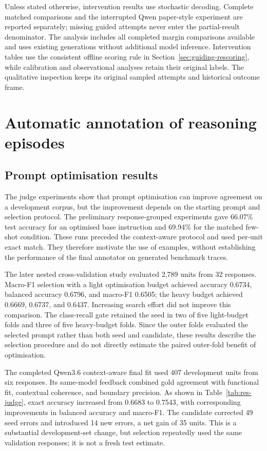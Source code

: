 \documentclass[12pt,a4paper,twoside,openright]{book}
\begin{document}
Unless stated otherwise, intervention results use
stochastic decoding. Complete matched comparisons and the interrupted
Qwen paper-style experiment are reported separately; missing guided
attempts never enter the partial-result denominator. The analysis includes
all completed margin comparisons available and uses existing
generations without additional model inference. Intervention tables use the consistent offline scoring rule in
Section~\ref{sec:guiding-rescoring}, while calibration and observational
analyses retain their original labels. The qualitative inspection keeps
its original sampled attempts and historical outcome frame.

\section{Automatic annotation of reasoning episodes}
\label{sec:results-annotation}

\subsection{Prompt optimisation results}

The judge experiments show that prompt optimisation can improve agreement
on a development corpus, but the improvement depends on the starting prompt
and selection protocol. The preliminary response-grouped experiments gave
66.07\% test accuracy for an optimised base instruction and 69.94\% for the
matched few-shot condition. These runs preceded the context-aware protocol
and used per-unit exact match. They therefore motivate the use of examples,
without establishing the performance of the final annotator on generated
benchmark traces.

The later nested cross-validation study evaluated 2,789 units from 32
responses. Macro-F1 selection with a light optimisation budget achieved
accuracy 0.6734, balanced accuracy 0.6796, and macro-F1 0.6505; the heavy
budget achieved 0.6669, 0.6737, and 0.6437. Increasing search effort did not
improve this comparison. The class-recall gate retained the seed in two of
five light-budget folds and three of five heavy-budget folds. Since the
outer folds evaluated the selected prompt rather than both seed and
candidate, these results describe the selection procedure and do not directly
estimate the paired outer-fold benefit of optimisation.

The completed Qwen3.6 context-aware final fit used 407 development units
from six responses. Its same-model feedback combined gold agreement with
functional fit, contextual coherence, and boundary precision. As shown in
Table~\ref{tab:res-judge}, exact accuracy increased from 0.6683 to 0.7543,
with corresponding improvements in balanced accuracy and macro-F1. The
candidate corrected 49 seed errors and introduced 14 new errors, a net gain
of 35 units. This is a substantial development-set change, but selection
repeatedly used the same validation responses; it is not a fresh test estimate.
\end{document}
